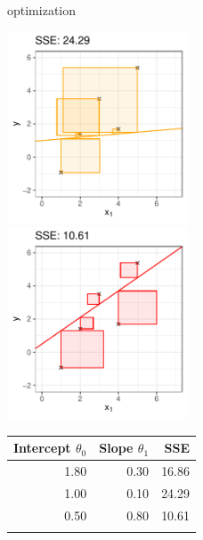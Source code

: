\documentclass[11pt,compress,t,notes=noshow, xcolor=table]{beamer}
\begin{document}
\begin{frame}{optimization}
\begin{minipage}[c]{0.5\textwidth}
{    \includegraphics[width=0.4\textwidth]{figure/reg_l2_sse_2.pdf} \\
    \includegraphics[width=0.4\textwidth]{figure/reg_l2_sse_3.pdf}
    \vfill \vspace{0.5cm} \scriptsize
    \begin{tabular}{r|r|r}
        Intercept $\theta_0$ & Slope $\theta_1$ & SSE
        \\ \hline 1.80 & 0.30 & 16.86\\ \hline 1.00 & 0.10 & 24.29 \\
        \hline 0.50 & 0.80 & 10.61 \\ \hline &&
    \end{tabular}
    }
\end{minipage}
\end{frame}
\end{document}
